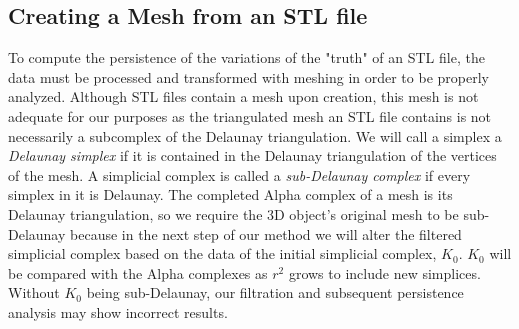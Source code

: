 \documentclass[ma]{uncgdissertationexp}
\theoremstyle{plain}
\theoremstyle{definition}
\theoremstyle{remark}
\begin{document}
\subsection{Creating a Mesh from an STL file}
\label{sec:mesh_from_stl}
\par To compute the persistence of the variations of the "truth" of an STL file, the data must be processed and transformed with meshing in order to be properly analyzed. Although STL files contain a mesh upon creation, this mesh is not adequate for our purposes as the triangulated mesh an STL file contains is not necessarily a subcomplex of the Delaunay triangulation. We will call a simplex a \textit{Delaunay simplex} if it is contained in the Delaunay triangulation of the vertices of the mesh. A simplicial complex is called a \textit{sub-Delaunay complex} if every simplex in it is Delaunay. The completed Alpha complex of a mesh is its Delaunay triangulation, so we require the 3D object's original mesh to be sub-Delaunay because in the next step of our method we will alter the filtered simplicial complex based on the data of the initial simplicial complex, $K_{0}$. $K_{0}$ will be compared with the Alpha complexes as $r^2$ grows to include new simplices. Without $K_0$ being sub-Delaunay, our filtration and subsequent persistence analysis may show incorrect results. 
\end{document}
